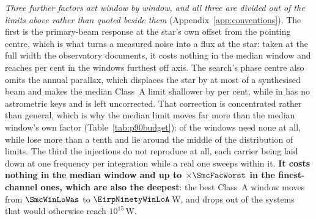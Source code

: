 \emph{Three further factors act window by window, and all three are divided
out of the limits above rather than quoted beside them}
(Appendix~\ref{app:conventions}). The first is the primary-beam response at
the star's own offset from the pointing centre, which is what turns a measured
noise into a flux at the star: taken at the full width the observatory
documents, it costs nothing in the median window and reaches
\BmShiftMaxPct{} per cent in the \BmNAboveTenPct{} windows furthest off axis.
The search's phase centre also omits the annual
parallax, which displaces the star by at most \SensBeamsMax{} of a synthesised
beam and makes the median Class~A limit shallower by \PxaShiftWinPct{} per
cent, while \PxaMissingStar{} in \PxaMissingEb{} has no astrometric keys and
is left uncorrected. That correction is concentrated rather than general,
which is why the median limit moves far more than the median window's own
factor (Table~\ref{tab:p90budget}): \RpPxNNone{} of the \NWinA{} windows need
none at all, while \RpPxNBig{} lose more than a tenth and lie around the
middle of the distribution of limits. The third the injections do not
reproduce at all, each carrier being laid down at one frequency per
integration while a real one sweeps within it.
\textbf{It costs nothing in the median window and up to $\times\SmcFacWorst$
in the \SmcNAbove{} finest-channel ones, which are also the deepest}: the best
Class~A window moves from $\SmcWinLoWas$ to $\EirpNinetyWinLoA$\,W, and
\SmcLostStars{} drops out of the \SmcSysEfifteenWas{} systems that would
otherwise reach $10^{15}$\,W.

